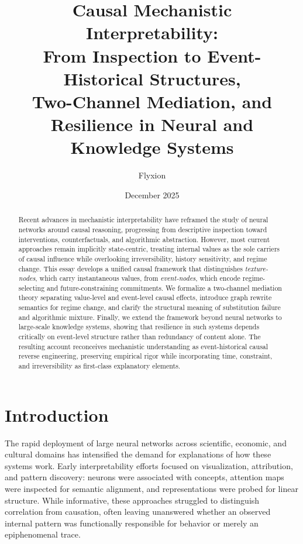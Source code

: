 \documentclass[11pt]{article}
\title{Causal Mechanistic Interpretability:\\
From Inspection to Event-Historical Structures,\\
Two-Channel Mediation, and Resilience in Neural and Knowledge Systems}
\author{Flyxion}
\date{December 2025}
\theoremstyle{remark}
\begin{document}
\maketitle

\begin{abstract}

Recent advances in mechanistic interpretability have reframed the study of neural networks around causal reasoning, progressing from descriptive inspection toward interventions, counterfactuals, and algorithmic abstraction. However, most current approaches remain implicitly state-centric, treating internal values as the sole carriers of causal influence while overlooking irreversibility, history sensitivity, and regime change. This essay develops a unified causal framework that distinguishes \emph{texture-nodes}, which carry instantaneous values, from \emph{event-nodes}, which encode regime-selecting and future-constraining commitments. We formalize a two-channel mediation theory separating value-level and event-level causal effects, introduce graph rewrite semantics for regime change, and clarify the structural meaning of substitution failure and algorithmic mixture. Finally, we extend the framework beyond neural networks to large-scale knowledge systems, showing that resilience in such systems depends critically on event-level structure rather than redundancy of content alone. The resulting account reconceives mechanistic understanding as event-historical causal reverse engineering, preserving empirical rigor while incorporating time, constraint, and irreversibility as first-class explanatory elements.

\end{abstract}

\tableofcontents

\section{Introduction}

The rapid deployment of large neural networks across scientific, economic, and cultural domains has intensified the demand for explanations of how these systems work. Early interpretability efforts focused on visualization, attribution, and pattern discovery: neurons were associated with concepts, attention maps were inspected for semantic alignment, and representations were probed for linear structure. While informative, these approaches struggled to distinguish correlation from causation, often leaving unanswered whether an observed internal pattern was functionally responsible for behavior or merely an epiphenomenal trace.
\end{document}
